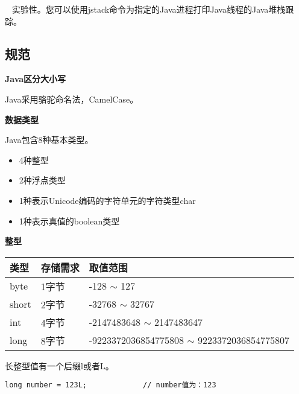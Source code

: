 ~ 实验性。您可以使用jstack命令为指定的Java进程打印Java线程的Java堆栈跟踪。\newline



\subsection{规范}

\textbf{Java区分大小写}

Java采用骆驼命名法，CamelCase。

\textbf{数据类型}

Java包含8种基本类型。\par
\begin{itemize}
        \item   4种整型
        \item   2种浮点类型 
        \item   1种表示Unicode编码的字符单元的字符类型char
        \item   1种表示真值的boolean类型
\end{itemize}


\textbf{整型}

\renewcommand\arraystretch{2}
\begin{tabular}{l|l|l}
    类型        &      存储需求        &     取值范围        \\               \hline
    byte       &       1字节          & -128 $\sim$ 127     \\
    short      &       2字节          & -32768 $\sim$ 32767  \\
    int        &       4字节          &  -2147483648 $\sim$ 2147483647  \\
    long       &       8字节          &  -9223372036854775808 $\sim$ 9223372036854775807  \\
\end{tabular}\newline


长整型值有一个后缀l或者L。

\begin{lstlisting}[style=cjava]
        long number = 123L;             // number值为：123
\end{lstlisting}

